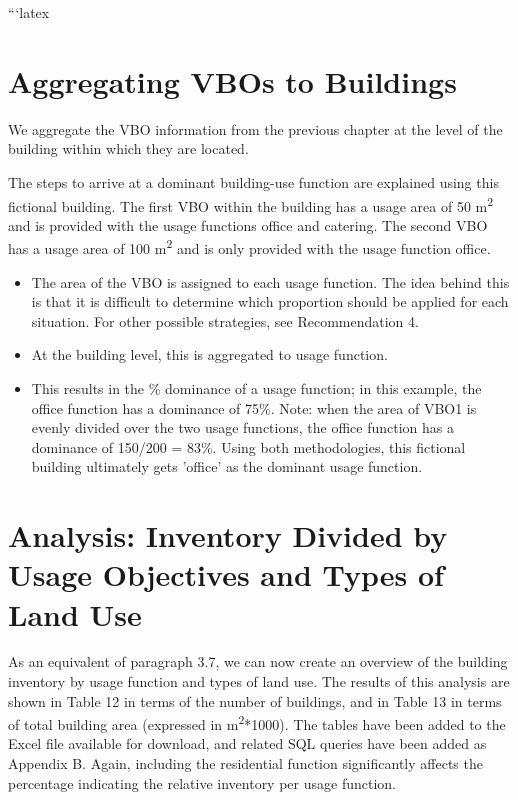 \documentclass{article}
\begin{document}

```latex
\section{Aggregating VBOs to Buildings}

We aggregate the VBO information from the previous chapter at the level of the building within which they are located.

The steps to arrive at a dominant building-use function are explained using this fictional building. The first VBO within the building has a usage area of 50 m\textsuperscript{2} and is provided with the usage functions office and catering. The second VBO has a usage area of 100 m\textsuperscript{2} and is only provided with the usage function office.

\begin{itemize}
    \item The area of the VBO is assigned to each usage function. The idea behind this is that it is difficult to determine which proportion should be applied for each situation. For other possible strategies, see Recommendation 4.
    \item At the building level, this is aggregated to usage function.
    \item This results in the \% dominance of a usage function; in this example, the office function has a dominance of 75\%. Note: when the area of VBO1 is evenly divided over the two usage functions, the office function has a dominance of 150/200 = 83\%. Using both methodologies, this fictional building ultimately gets 'office' as the dominant usage function.
\end{itemize}

\section{Analysis: Inventory Divided by Usage Objectives and Types of Land Use}

As an equivalent of paragraph 3.7, we can now create an overview of the building inventory by usage function and types of land use. The results of this analysis are shown in Table 12 in terms of the number of buildings, and in Table 13 in terms of total building area (expressed in m\textsuperscript{2}*1000). The tables have been added to the Excel file available for download, and related SQL queries have been added as Appendix B. Again, including the residential function significantly affects the percentage indicating the relative inventory per usage function. 
\end{document}
